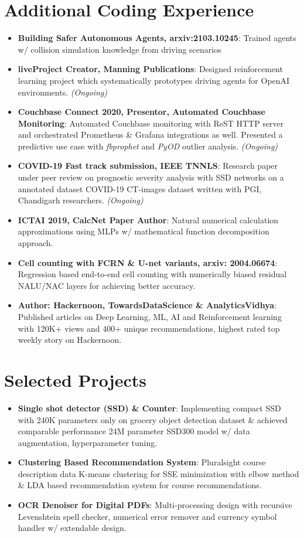 \documentclass[letterpaper,10pt]{article}
\newcommand{\resumeItem}[2]{
  \item\small{
    \textbf{#1}{: #2 \vspace{-2pt}}
  }
}
\newcommand{\resumeSubItem}[2]{\resumeItem{#1}{#2}\vspace{-4pt}}
\newcommand{\resumeSubHeadingListStart}{\begin{itemize}[leftmargin=*]}
\newcommand{\resumeSubHeadingListEnd}{\end{itemize}}
\begin{document}
\section{Additional Coding Experience}
  \resumeSubHeadingListStart
      \resumeSubItem{Building Safer Autonomous Agents, arxiv:2103.10245}
      {Trained agents w/ collision simulation knowledge from driving scenarios }
      \resumeSubItem{liveProject Creator, Manning Publications}
      {Designed reinforcement learning project which systematically prototypes driving agents for OpenAI environments. \textit{(Ongoing)} }      
      \resumeSubItem{Couchbase Connect 2020, Presentor, Automated Couchbase Monitoring}
      {Automated Couchbase monitoring with ReST HTTP server and orchestrated Prometheus \& Grafana integrations as well. Presented a predictive use case with \textit{fbprophet} and \textit{PyOD} outlier analysis.  \textit{(Ongoing)} }
       \resumeSubItem{COVID-19 Fast track submission, IEEE TNNLS}
      {Research paper under peer review on prognostic severity analysis with SSD networks on a annotated dataset COVID-19 CT-images dataset written with PGI, Chandigarh researchers. \textit{(Ongoing)}}
       \resumeSubItem{ICTAI 2019, CalcNet Paper Author}
      {Natural numerical calculation approximations using MLPs w/ mathematical function decomposition approach.}
      \resumeSubItem{Cell counting with FCRN \& U-net variants, arxiv: 2004.06674}
      {Regression based end-to-end cell counting with numerically biased residual NALU/NAC layers for achieving better accuracy.}
       \resumeSubItem{Author: Hackernoon, TowardsDataScience \& AnalyticsVidhya}
      {Published articles on Deep Learning, ML, AI and Reinforcement learning with 120K+  views and 400+ unique recommendations, highest rated top weekly story on Hackernoon.}
  \resumeSubHeadingListEnd


\section{Selected Projects}
  \resumeSubHeadingListStart
    \resumeSubItem{Single shot detector (SSD) \& Counter}
      {Implementing compact SSD with 240K parameters only on grocery object detection dataset \& achieved comparable performance 24M parameter SSD300 model w/ data augmentation, hyperparameter tuning.}
    \resumeSubItem{Clustering Based Recommendation System}
      {Pluralsight course description data K-means clustering for SSE minimization with elbow method \& LDA based recommendation system for course recommendations.}
    \resumeSubItem{OCR Denoiser for Digital PDFs}
      {Multi-processing design with recursive Levenshtein spell checker, numerical error remover and currency symbol handler w/ extendable design.}
  \resumeSubHeadingListEnd
\end{document}
